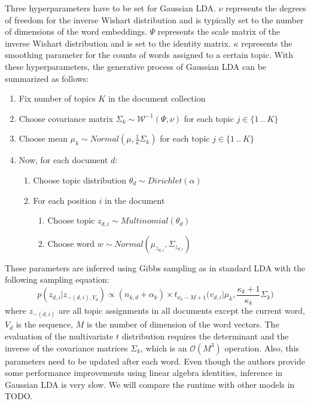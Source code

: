 \documentclass[
        a4paper,
        titlepage,
        twoside,
        parskip
        ]{scrbook}
\theoremstyle{break}
\begin{document}
Three hyperparameters have to be set for Gaussian LDA.
$\nu$ represents the degrees of freedom for the inverse Wishart distribution and is typically set to the number of dimensions of the word embeddings.
$\Psi$ represents the scale matrix of the inverse Wishart distribution and is set to the identity matrix.
$\kappa$ represents the smoothing parameter for the counts of words assigned to a certain topic.
With these hyperparameters, the generative process of Gaussian LDA can be summarized as follows:
\begin{enumerate}
       \item Fix number of topics $K$ in the document collection
       \item Choose covariance matrix $\Sigma_k \sim \mathcal{W}^{-1}(\Psi, \nu)$ for each topic $j \in \{1~..~K\}$
       \item Choose mean $\mu_k \sim Normal(\mu, \frac{1}{\kappa} \Sigma_k)$ for each topic $j \in \{1~..~K\}$
       \item Now, for each document $d$:
       \begin{enumerate}
              \item Choose topic distribution $\theta_d \sim Dirichlet(\alpha)$
              \item For each position $i$ in the document
              \begin{enumerate}
                     \item Choose topic $z_{d,i} \sim Multinomial(\theta_d)$
                     \item Choose word $w \sim Normal(\mu_{z_{d,i}}, \Sigma_{z_{d,i}})$
              \end{enumerate}
       \end{enumerate}
\end{enumerate}

These parameters are inferred using Gibbs sampling as in standard LDA with the following sampling equation: %
\begin{equation*}
  p(z_{d,i} | z_{-(d,i), V_d}) \propto (n_{k,d} + \alpha_k) \times t_{\nu_k - M + 1}\Big(v_{d,i} \Big| \mu_k, \frac{\kappa_k + 1}{\kappa_k} \Sigma_k\Big)
\end{equation*}
where $z_{-(d,i)}$ are all topic assignments in all documents except the current word, $V_d$ is the sequence, $M$ is the number of dimension of the word vectors.
The evaluation of the multivariate $t$ distribution requires the determinant and the inverse of the covariance matrices $\Sigma_k$, which is an $\mathcal{O}(M^3)$ operation.
Also, this parameters need to be updated after each word.
Even though the authors provide some performance improvements using linear algebra identities, inference in Gaussian LDA is very slow.
We will compare the runtime with other models in TODO.
\end{document}
